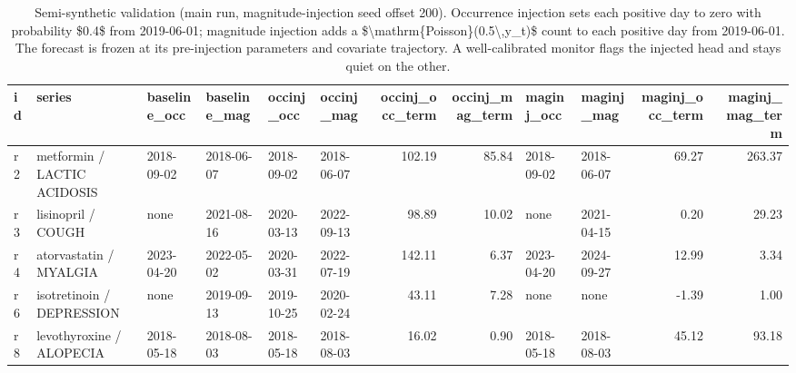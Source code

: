 \begin{table}

\caption{Semi-synthetic validation (main run, magnitude-injection seed offset 200). Occurrence injection sets each positive day to zero with probability \$0.4\$ from 2019-06-01; magnitude injection adds a \$\textbackslash{}mathrm\{Poisson\}(0.5\textbackslash{},y\_t)\$ count to each positive day from 2019-06-01. The forecast is frozen at its pre-injection parameters and covariate trajectory. A well-calibrated monitor flags the injected head and stays quiet on the other.}
\centering
\begin{tabular}[t]{llllllrrllrr}
\toprule
id & series & baseline\_occ & baseline\_mag & occinj\_occ & occinj\_mag & occinj\_occ\_term & occinj\_mag\_term & maginj\_occ & maginj\_mag & maginj\_occ\_term & maginj\_mag\_term\\
\midrule
r2 & metformin / LACTIC ACIDOSIS & 2018-09-02 & 2018-06-07 & 2018-09-02 & 2018-06-07 & 102.19 & 85.84 & 2018-09-02 & 2018-06-07 & 69.27 & 263.37\\
r3 & lisinopril / COUGH & none & 2021-08-16 & 2020-03-13 & 2022-09-13 & 98.89 & 10.02 & none & 2021-04-15 & 0.20 & 29.23\\
r4 & atorvastatin / MYALGIA & 2023-04-20 & 2022-05-02 & 2020-03-31 & 2022-07-19 & 142.11 & 6.37 & 2023-04-20 & 2024-09-27 & 12.99 & 3.34\\
r6 & isotretinoin / DEPRESSION & none & 2019-09-13 & 2019-10-25 & 2020-02-24 & 43.11 & 7.28 & none & none & -1.39 & 1.00\\
r8 & levothyroxine / ALOPECIA & 2018-05-18 & 2018-08-03 & 2018-05-18 & 2018-08-03 & 16.02 & 0.90 & 2018-05-18 & 2018-08-03 & 45.12 & 93.18\\
\bottomrule
\end{tabular}
\end{table}
